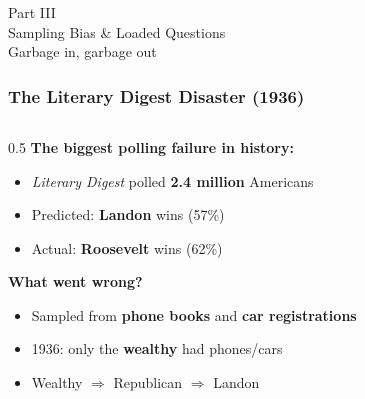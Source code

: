 \documentclass[aspectratio=169]{beamer}
\begin{document}

\begin{frame}
\frametitle{}
\begin{center}
{\Huge \textcolor{popblue}{Part III}}\\[10pt]
{\LARGE Sampling Bias \& Loaded Questions}\\[8pt]
{\large Garbage in, garbage out}
\end{center}
\end{frame}

\begin{frame}
\frametitle{The Literary Digest Disaster (1936)}

\begin{columns}[T]
\begin{column}{0.5\textwidth}
\vspace{0.1cm}
{\small\textbf{The biggest polling failure in history:}}
\begin{itemize}\setlength{\itemsep}{0pt}\setlength{\parsep}{0pt}
  \item \textit{Literary Digest} polled \textbf{2.4 million} Americans
  \item Predicted: \textbf{Landon} wins (57\%)
  \item Actual: \textbf{Roosevelt} wins (62\%)
\end{itemize}

\vspace{0.05cm}
{\small\textbf{What went wrong?}}
\begin{itemize}\setlength{\itemsep}{0pt}\setlength{\parsep}{0pt}
  \item Sampled from \textbf{phone books} and \textbf{car registrations}
  \item 1936: only the \textbf{wealthy} had phones/cars
  \item Wealthy $\Rightarrow$ Republican $\Rightarrow$ Landon
\end{itemize}


\end{column}
\end{columns}
\end{frame}
\end{document}

